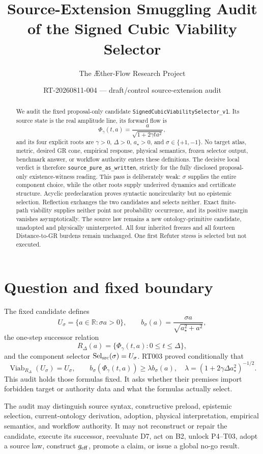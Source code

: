 \documentclass[11pt]{article}
\title{Source-Extension Smuggling Audit of the Signed Cubic Viability Selector}
\author{The \AE ther-Flow Research Project}
\date{RT-20260811-004 --- draft/control source-extension audit}
\newcommand{\R}{\mathbb{R}}
\newcommand{\PhiFlow}{\Phi_{\gamma}}
\newcommand{\Viab}{\operatorname{Viab}}
\begin{document}
\maketitle

\begin{abstract}
We audit the fixed proposal-only candidate
\texttt{SignedCubicViabilitySelector\_v1}.  Its source state is the real
amplitude line, its forward flow is
\[
 \PhiFlow(t,a)=\frac{a}{\sqrt{1+2\gamma t a^2}},
\]
and its four explicit roots are $\gamma>0$, $\Delta>0$, $a_\star>0$, and
$\sigma\in\{+1,-1\}$.  No target atlas, metric, desired GR cone, empirical
response, physical semantics, frozen selector output, benchmark answer, or
workflow authority enters these definitions.  The decisive local verdict is
therefore \texttt{source\_pure\_as\_written}, strictly for the fully disclosed
proposal-only existence-witness reading.  This pass is deliberately weak:
$\sigma$ supplies the entire component choice, while the other roots supply
underived dynamics and certificate structure.  Acyclic predeclaration proves
syntactic noncircularity but no epistemic selection.  Reflection exchanges
the two candidates and selects neither.  Exact finite-path viability supplies
neither point nor probability occurrence, and its positive margin vanishes
asymptotically.  The source law remains a new ontology-primitive candidate,
unadopted and physically uninterpreted.  All four inherited freezes and all
fourteen Distance-to-GR burdens remain unchanged.  One first Refuter stress is
selected but not executed.
\end{abstract}

\section{Question and fixed boundary}

The fixed candidate defines
\[
 U_\sigma=\{a\in\R:\sigma a>0\},\qquad
 b_\sigma(a)=\frac{\sigma a}{\sqrt{a_\star^2+a^2}},
\]
the one-step successor relation
\[
 R_\Delta(a)=\{\PhiFlow(t,a):0\le t\le\Delta\},
\]
and the component selector $\operatorname{Sel}_{\rm src}(\sigma)=U_\sigma$.
RT003 proved conditionally that
\[
 \Viab_{R_\Delta}(U_\sigma)=U_\sigma,
 \qquad
 b_\sigma(\PhiFlow(t,a))\ge
 \lambda b_\sigma(a),
 \quad
 \lambda=(1+2\gamma\Delta a_\star^2)^{-1/2}.
\]
This audit holds those formulas fixed.  It asks whether their premises import
forbidden target or authority data and what the formulas actually select.

The audit may distinguish source syntax, constructive preload, epistemic
selection, current-ontology derivation, adoption, physical interpretation,
empirical semantics, and workflow authority.  It may not reconstruct or
repair the candidate, execute its successor, reevaluate D7, act on B2, unlock
P4--T03, adopt a source law, construct $g_{\rm eff}$, promote a claim, or issue
a global no-go result.
\end{document}
